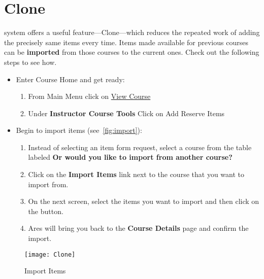 \chapter{Clone}
\label{ch:clone}
\ares system offers a useful feature---Clone---which reduces the repeated work of adding the precisely same items every time. Items made available for previous courses can be \textbf{imported} from those courses to the current ones. Check out the following steps to see how.

\begin{itemize}
    \item Enter Course Home and get ready:
    \begin{enumerate}
        \item From {\imp Main Menu} click on \uline{View Course}
        \item Under \textbf{Instructor Course Tools} Click on {\imp Add Reserve Items} 
    \end{enumerate}
    \item Begin to import items (see~\autoref{fig:import}):
    \begin{enumerate}
        \item Instead of selecting an item form request, select a course from the table labeled \textbf{Or would you like to import from another course?}
        \item Click on the \textbf{Import Items} link next to the course that you want to import from.
        \item On the next screen, select the items you want to import and then click on the  button.
        \item Ares will bring you back to the \textbf{Course Details} page and confirm the import.
    \end{enumerate}
\end{itemize}

\vspace*{4ex}
\begin{figure}[h]
    \centering
    \texttt{[image: Clone]}
    \caption{Import Items}
    \label{fig:import}
\end{figure}